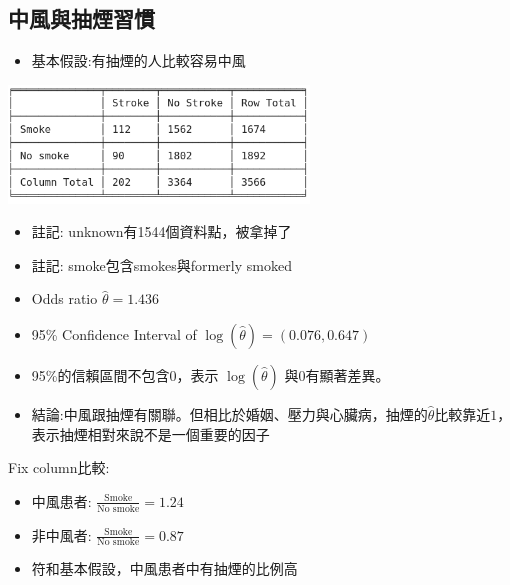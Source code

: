 \subsection{中風與抽煙習慣}
\begin{itemize}
    \item 基本假設:有抽煙的人比較容易中風
\end{itemize}
\begin{center}
    \includegraphics[width=8cm]{./two_by_two_table/smoke_stroke.png}
\end{center}
\begin{itemize}
    \item 註記: unknown有1544個資料點，被拿掉了
    \item 註記: smoke包含smokes與formerly smoked
    \item Odds ratio $\hat{\theta}=1.436$
    \item 95\% Confidence Interval of $\log{(\hat{\theta})}=(0.076, 0.647)$
    \item 95\%的信賴區間不包含0，表示 $\log{(\hat{\theta})}$ 與0有顯著差異。
    \item 結論:中風跟抽煙有關聯。但相比於婚姻、壓力與心臟病，抽煙的$\hat{\theta}$比較靠近$1$，表示抽煙相對來說不是一個重要的因子
\end{itemize}
Fix column比較:
\begin{itemize}
    \item 中風患者: $\frac{\text{Smoke}}{\text{No smoke}}=1.24$
    \item 非中風者: $\frac{\text{Smoke}}{\text{No smoke}}=0.87$
    \item 符和基本假設，中風患者中有抽煙的比例高
\end{itemize}

